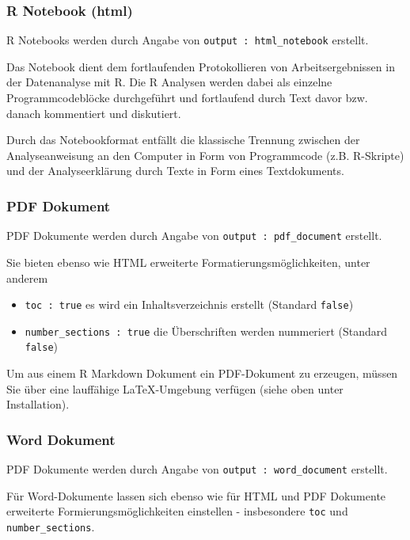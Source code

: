 \documentclass[
]{article}
\providecommand{\tightlist}{%
  \setlength{\itemsep}{0pt}\setlength{\parskip}{0pt}}
\begin{document}
\hypertarget{r-notebook-html}{%
\subsubsection{R Notebook (html)}\label{r-notebook-html}}

R Notebooks werden durch Angabe von \texttt{output\ :\ html\_notebook}
erstellt.

Das Notebook dient dem fortlaufenden Protokollieren von
Arbeitsergebnissen in der Datenanalyse mit R. Die R Analysen werden
dabei als einzelne Programmcodeblöcke durchgeführt und fortlaufend durch
Text davor bzw. danach kommentiert und diskutiert.

Durch das Notebookformat entfällt die klassische Trennung zwischen der
Analyseanweisung an den Computer in Form von Programmcode (z.B.
R-Skripte) und der Analyseerklärung durch Texte in Form eines
Textdokuments.

\hypertarget{pdf-dokument}{%
\subsubsection{PDF Dokument}\label{pdf-dokument}}

PDF Dokumente werden durch Angabe von \texttt{output\ :\ pdf\_document}
erstellt.

Sie bieten ebenso wie HTML erweiterte Formatierungsmöglichkeiten, unter
anderem

\begin{itemize}
\tightlist
\item
  \texttt{toc\ :\ true} es wird ein Inhaltsverzeichnis erstellt
  (Standard \texttt{false})
\item
  \texttt{number\_sections\ :\ true} die Überschriften werden nummeriert
  (Standard \texttt{false})
\end{itemize}

Um aus einem R Markdown Dokument ein PDF-Dokument zu erzeugen, müssen
Sie über eine lauffähige LaTeX-Umgebung verfügen (siehe oben unter
Installation).

\hypertarget{word-dokument}{%
\subsubsection{Word Dokument}\label{word-dokument}}

PDF Dokumente werden durch Angabe von \texttt{output\ :\ word\_document}
erstellt.

Für Word-Dokumente lassen sich ebenso wie für HTML und PDF Dokumente
erweiterte Formierungsmöglichkeiten einstellen - insbesondere
\texttt{toc} und \texttt{number\_sections}.
\end{document}
